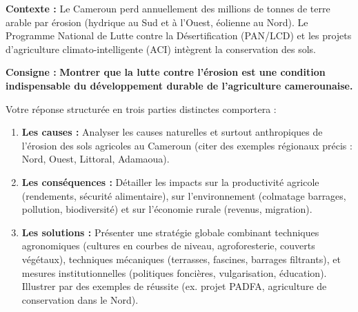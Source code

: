 \documentclass[11pt]{article}
\begin{document}
\begin{exercice}
\textbf{Contexte :} Le Cameroun perd annuellement des millions de tonnes de terre arable par érosion (hydrique au Sud et à l'Ouest, éolienne au Nord). Le Programme National de Lutte contre la Désertification (PAN/LCD) et les projets d'agriculture climato-intelligente (ACI) intègrent la conservation des sols.

\textbf{Consigne :} \textbf{Montrer que la lutte contre l'érosion est une condition indispensable du développement durable de l'agriculture camerounaise.}

Votre réponse structurée en trois parties distinctes comportera :
\begin{enumerate}
    \item \textbf{Les causes :} Analyser les causes naturelles et surtout anthropiques de l'érosion des sols agricoles au Cameroun (citer des exemples régionaux précis : Nord, Ouest, Littoral, Adamaoua).
    \item \textbf{Les conséquences :} Détailler les impacts sur la productivité agricole (rendements, sécurité alimentaire), sur l'environnement (colmatage barrages, pollution, biodiversité) et sur l'économie rurale (revenus, migration).
    \item \textbf{Les solutions :} Présenter une stratégie globale combinant techniques agronomiques (cultures en courbes de niveau, agroforesterie, couverts végétaux), techniques mécaniques (terrasses, fascines, barrages filtrants), et mesures institutionnelles (politiques foncières, vulgarisation, éducation). Illustrer par des exemples de réussite (ex. projet PADFA, agriculture de conservation dans le Nord).
\end{enumerate}
\end{exercice}
\end{document}
